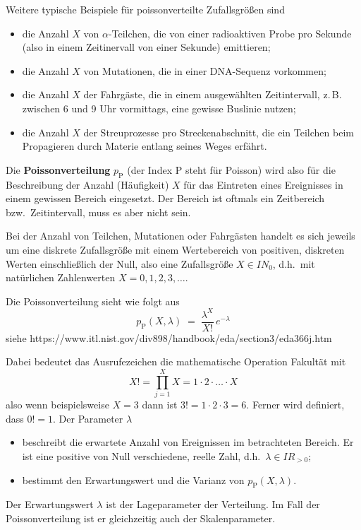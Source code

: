 Weitere typische Beispiele für poissonverteilte Zufallsgrößen sind
\begin{itemize}
\item die Anzahl $X$ von $\alpha$-Teilchen, die von einer radioaktiven Probe pro Sekunde (also in einem Zeitinervall
von einer Sekunde) emittieren;
\item die Anzahl $X$ von Mutationen, die in einer DNA-Sequenz vorkommen;
\item die Anzahl $X$ der Fahrgäste, die in einem ausgewählten Zeitintervall, z.\,B. zwischen 6 und 9 Uhr vormittags, eine gewisse Buslinie nutzen;
\item die Anzahl $X$ der Streuprozesse pro Streckenabschnitt, die ein Teilchen beim Propagieren durch Materie entlang seines Weges erfährt.

\end{itemize}

Die \textbf{Poissonverteilung}  $p_\mathrm{P}$ (der Index $\mathrm{P}$ steht für Poisson) wird also für die Beschreibung
der Anzahl (Häufigkeit) $X$ für das Eintreten eines Ereignisses in einem gewissen Bereich  eingesetzt.
Der Bereich ist oftmals ein Zeitbereich bzw.\ Zeitintervall, muss es aber nicht sein.

Bei der Anzahl von Teilchen, Mutationen oder Fahrgästen handelt es sich jeweils um eine
diskrete Zufallsgröße mit einem Wertebereich von positiven, diskreten Werten einschließlich der Null,
also eine Zufallsgröße $X \in I\!\!N_0$, d.h.\ mit natürlichen Zahlenwerten $X = 0, 1, 2, 3, \dots$.

Die Poissonverteilung sieht wie folgt aus
\begin{equation}
p_\mathrm{P}(X, \lambda) \; = \; \frac{\lambda^X}{X!} \, e^{-\lambda}
\end{equation}
siehe https://www.itl.nist.gov/div898/handbook/eda/section3/eda366j.htm

Dabei bedeutet das Ausrufezeichen die mathematische Operation Fakultät mit
$$
X! = \prod\limits_{j=1}^{X} X = 1 \cdot 2 \cdot \ldots \cdot X
$$
also wenn  beispielsweise $X = 3$ dann ist $3! = 1 \cdot 2 \cdot 3 = 6$.
Ferner wird definiert, dass $0! = 1$.
Der Parameter $\lambda$
\begin{itemize}
\item beschreibt die erwartete Anzahl von Ereignissen im betrachteten Bereich. Er ist eine
positive von Null verschiedene, reelle Zahl, d.h.\ $\lambda \in I\!\!R_{> 0}$;
\item bestimmt den Erwartungswert und die Varianz von $p_\mathrm{P}(X, \lambda)$.
\end{itemize}
Der Erwartungswert $\lambda$ ist der Lageparameter der Verteilung.
Im Fall der Poissonverteilung ist er gleichzeitig auch der Skalenparameter.


